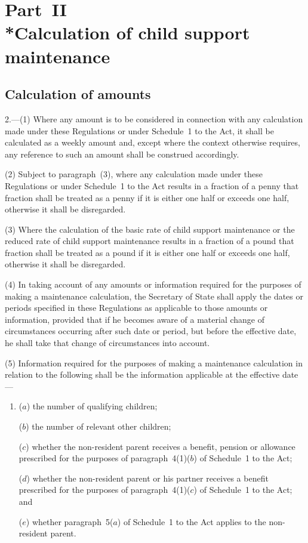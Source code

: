 \documentclass[12pt,a4paper]{article}
\begin{document}

\section[Part~II --- Calculation of child support maintenance]{Part~II\\*Calculation of child support maintenance}

\renewcommand\parthead{--- Part~II}

\subsection[2. Calculation of amounts]{Calculation of amounts}

2.---(1)  Where any amount is to be considered in connection with any calculation made under these Regulations or under Schedule~1 to the Act, it shall be calculated as a weekly amount and, except where the context otherwise requires, any reference to such an amount shall be construed accordingly.

(2) Subject to paragraph~(3), where any calculation made under these Regulations or under Schedule~1 to the Act results in a fraction of a penny that fraction shall be treated as a penny if it is either one half or exceeds one half, otherwise it shall be disregarded.

(3) Where the calculation of the basic rate of child support maintenance or the reduced rate of child support maintenance results in a fraction of a pound that fraction shall be treated as a pound if it is either one half or exceeds one half, otherwise it shall be disregarded.

(4) In taking account of any amounts or information required for the purposes of making a maintenance calculation, the Secretary of State shall apply the dates or periods specified in these Regulations as applicable to those amounts or information, provided that if he becomes aware of a material change of circumstances occurring after such date or period, but before the effective date, he shall take that change of circumstances into account.

(5) Information required for the purposes of making a maintenance calculation in relation to the following shall be the information applicable at the effective date—
\begin{enumerate}\item[]
($a$) the number of qualifying children;

($b$) the number of relevant other children;

($c$) whether the non-resident parent receives a benefit, pension or allowance prescribed for the purposes of paragraph~4(1)($b$)  of Schedule~1 to the Act;

($d$) whether the non-resident parent or his partner receives a benefit prescribed for the purposes of paragraph~4(1)($c$)  of Schedule~1 to the Act; and

($e$) whether paragraph~5($a$)  of Schedule~1 to the Act applies to the non-resident parent.
\end{enumerate}
\end{document}
